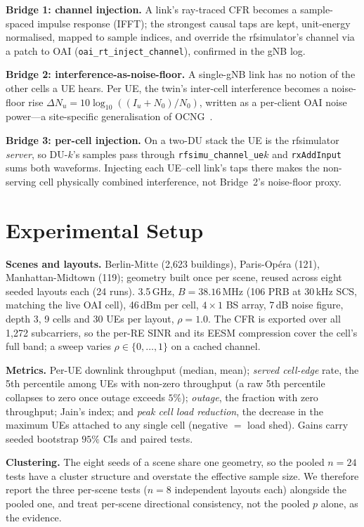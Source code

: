 \documentclass[conference]{IEEEtran}
\begin{document}
\textbf{Bridge 1: channel injection.} A link's ray-traced CFR becomes a sample-spaced impulse response (IFFT); the strongest causal taps are kept, unit-energy normalised, mapped to sample indices, and override the rfsimulator's channel via a patch to OAI (\texttt{oai\_rt\_inject\_channel}), confirmed in the gNB log.

\textbf{Bridge 2: interference-as-noise-floor.} A single-gNB link has no notion of the other cells a UE hears. Per UE, the twin's inter-cell interference becomes a noise-floor rise $\Delta N_u=10\log_{10}((I_u+N_0)/N_0)$, written as a per-client OAI noise power---a site-specific generalisation of OCNG~\cite{ocng}.

\textbf{Bridge 3: per-cell injection.} On a two-DU stack the UE is the rfsimulator \emph{server}, so DU-$k$'s samples pass through \texttt{rfsimu\_channel\_ue}$k$ and \texttt{rxAddInput} sums both waveforms. Injecting each UE--cell link's taps there makes the non-serving cell physically combined interference, not Bridge~2's noise-floor proxy.

\section{Experimental Setup}
\textbf{Scenes and layouts.} Berlin-Mitte (2{,}623 buildings), Paris-Op\'era (121), Manhattan-Midtown (119); geometry built once per scene, reused across eight seeded layouts each (24 runs). 3.5\,GHz, $B=38.16$\,MHz (106 PRB at 30\,kHz SCS, matching the live OAI cell), 46\,dBm per cell, $4\times1$ BS array, 7\,dB noise figure, depth 3, 9 cells and 30 UEs per layout, $\rho=1.0$. The CFR is exported over all 1{,}272 subcarriers, so the per-RE SINR and its EESM compression cover the cell's full band; a sweep varies $\rho\in\{0,\dots,1\}$ on a cached channel.

\textbf{Metrics.} Per-UE downlink throughput (median, mean); \emph{served cell-edge} rate, the 5th percentile among UEs with non-zero throughput (a raw 5th percentile collapses to zero once outage exceeds $5\%$); \emph{outage}, the fraction with zero throughput; Jain's index; and \emph{peak cell load reduction}, the decrease in the maximum UEs attached to any single cell (negative $=$ load shed). Gains carry seeded bootstrap $95\%$ CIs and paired tests.

\textbf{Clustering.} The eight seeds of a scene share one geometry, so the pooled $n{=}24$ tests have a cluster structure and overstate the effective sample size. We therefore report the three per-scene tests ($n{=}8$ independent layouts each) alongside the pooled one, and treat per-scene directional consistency, not the pooled $p$ alone, as the evidence.
\end{document}

